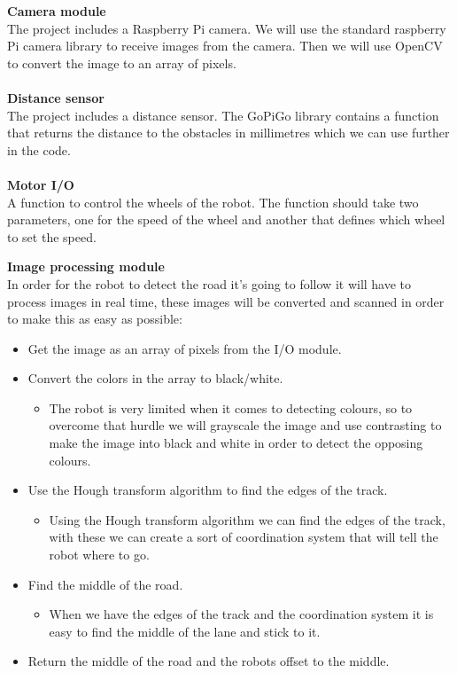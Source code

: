 \documentclass[11pt]{article}
\newenvironment{myenv}{\begin{adjustwidth}{1cm}{}}{\end{adjustwidth}}
\begin{document}
\begin{myenv}

    \textbf{Camera module}
    \\
    The project includes a Raspberry Pi camera. We will use the standard raspberry Pi camera library to receive images from the camera. Then we will use OpenCV to convert the image to an array of pixels.
    \\\\
    \textbf{Distance sensor}
    \\ 
    The project includes a distance sensor. The GoPiGo library contains a function that returns the distance to the obstacles in millimetres which we can use further in the code. 
    \\\\
    \textbf{Motor I/O}
    \\
    A function to control the wheels of the robot. The function should take two parameters, one for the speed of the wheel and another that defines which wheel to set the speed. \\
\end{myenv}
\textbf{Image processing module}
\\
In order for the robot to detect the road it’s going to follow it will have to process images in real time, these images will be converted and scanned in order to make this as easy as possible:
\begin{itemize}
    \item Get the image as an array of pixels from the I/O module. 
    \item Convert the colors in the array to black/white. \begin{itemize}
        \item The robot is very limited when it comes to detecting colours, so to overcome that hurdle we will grayscale the image and use contrasting to make the image into black and white in order to detect the opposing colours.
    \end{itemize}
    \item Use the Hough transform algorithm to find the edges of the track. \begin{itemize}
        \item Using the Hough transform algorithm we can find the edges of the track, with these we can create a sort of coordination system that will tell the robot where to go.
    \end{itemize}
    \item Find the middle of the road. \begin{itemize}
        \item When we have the edges of the track and the coordination system it is easy to find the middle of the lane and stick to it.
    \end{itemize}
    \item Return the middle of the road and the robots offset to the middle. 
\end{itemize}
\end{document}
